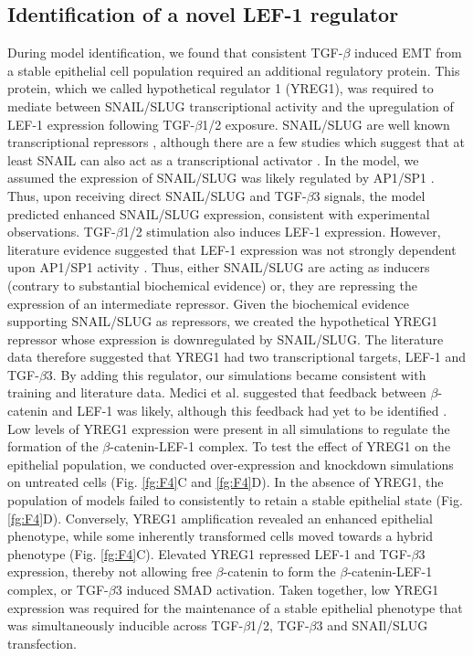 \documentclass[11pt,letterpaper]{article}
\begin{document}
\subsection*{Identification of a novel LEF-1 regulator}
During model identification, we found that consistent TGF-$\beta$ induced EMT from a stable epithelial cell population required an additional regulatory protein.
This protein, which we called hypothetical regulator 1 (YREG1), was required to mediate between SNAIL/SLUG transcriptional activity
and the upregulation of LEF-1 expression following TGF-$\beta$1/2 exposure.
SNAIL/SLUG are well known transcriptional repressors \cite{Hemavathy:2000aa,Hemavathy:2000ab,Dhasarathy:2011aa}, although there are a few studies
which suggest that at least SNAIL can also act as a transcriptional activator \cite{Guaita:2002aa}.
In the model, we assumed the expression of SNAIL/SLUG was likely regulated by AP1/SP1 \cite{Jackstadt:2013aa}.
Thus, upon receiving direct SNAIL/SLUG and TGF-$\beta$3 signals, the model predicted enhanced SNAIL/SLUG expression, consistent with experimental observations.
TGF-$\beta$1/2 stimulation also induces LEF-1 expression. However, literature evidence suggested that LEF-1 expression was not strongly dependent upon AP1/SP1 activity \cite{Eastman:1999aa}.
Thus, either SNAIL/SLUG are acting as inducers (contrary to substantial biochemical evidence) or, they are repressing the expression of an intermediate repressor.
Given the biochemical evidence supporting SNAIL/SLUG as repressors, we created the hypothetical YREG1 repressor whose
expression is downregulated by SNAIL/SLUG. The literature data therefore suggested that YREG1 had two transcriptional targets, LEF-1 and TGF-$\beta$3.
By adding this regulator, our simulations became consistent with training and literature data.
Medici et al. suggested that feedback between $\beta$-catenin and LEF-1 was likely, although this feedback had yet to be identified \cite{Medici:2008fk}.
Low levels of YREG1 expression were present in all simulations to regulate the formation of the $\beta$-catenin-LEF-1 complex.
To test the effect of YREG1 on the epithelial population, we conducted over-expression and knockdown simulations on untreated cells (Fig. \ref{fg:F4}C and \ref{fg:F4}D).
In the absence of YREG1, the population of models failed to consistently to retain a stable epithelial state (Fig. \ref{fg:F4}D).
Conversely, YREG1 amplification revealed an enhanced epithelial phenotype, while some inherently transformed cells moved towards a hybrid phenotype  (Fig. \ref{fg:F4}C).
Elevated YREG1 repressed LEF-1 and TGF-$\beta$3 expression, thereby not allowing free $\beta$-catenin to form the $\beta$-catenin-LEF-1 complex, or TGF-$\beta$3 induced SMAD activation.
Taken together, low YREG1 expression was required for the maintenance of a stable epithelial phenotype that was simultaneously inducible across TGF-$\beta$1/2, TGF-$\beta$3 and SNAIl/SLUG transfection.
\end{document}
